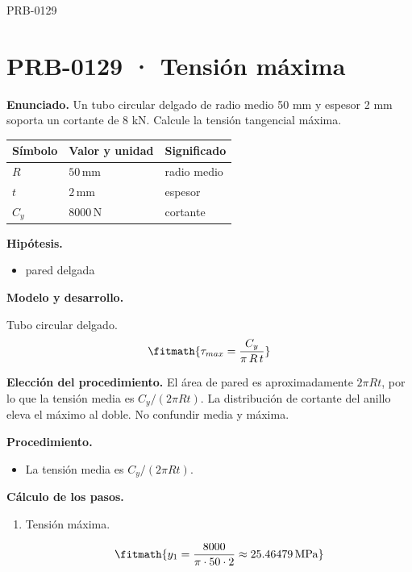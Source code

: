 \begin{studiumworked}{PRB-0129}

\section{PRB-0129 · Tensión máxima}

\textbf{Enunciado.} Un tubo circular delgado de radio medio 50 mm y espesor 2 mm soporta un cortante de 8 kN. Calcule la tensión tangencial máxima.

\par\medskip\noindent\begin{tabular}{@{}p{.18\linewidth}p{.26\linewidth}p{.48\linewidth}@{}}
\toprule Símbolo & Valor y unidad & Significado\\\midrule
$R$ & $50\,\mathrm{mm}$ & radio medio\\
$t$ & $2\,\mathrm{mm}$ & espesor\\
$C_{y}$ & $8000\,\mathrm{N}$ & cortante\\
\bottomrule\end{tabular}\par\medskip

\textbf{Hipótesis.}\begin{itemize}\item pared delgada\end{itemize}

\textbf{Modelo y desarrollo.}

Tubo circular delgado.\[\fitmath{\tau_{max} = \frac{C_y}{\pi\,R\,t}}\]

\textbf{Elección del procedimiento.} El área de pared es aproximadamente $2\pi Rt$, por lo que la tensión media es $C_y/(2\pi Rt)$. La distribución de cortante del anillo eleva el máximo al doble. No confundir media y máxima.

\textbf{Procedimiento.}\begin{itemize}\item La tensión media es $C_y/(2\pi R t)$.\end{itemize}

\textbf{Cálculo de los pasos.}

\begin{enumerate}

\item Tensión máxima.

\[\fitmath{y_{1}=\frac{8000}{\pi\cdot 50\cdot 2}\approx 25.46479\,\mathrm{MPa}}\]

\end{enumerate}


\end{studiumworked}
